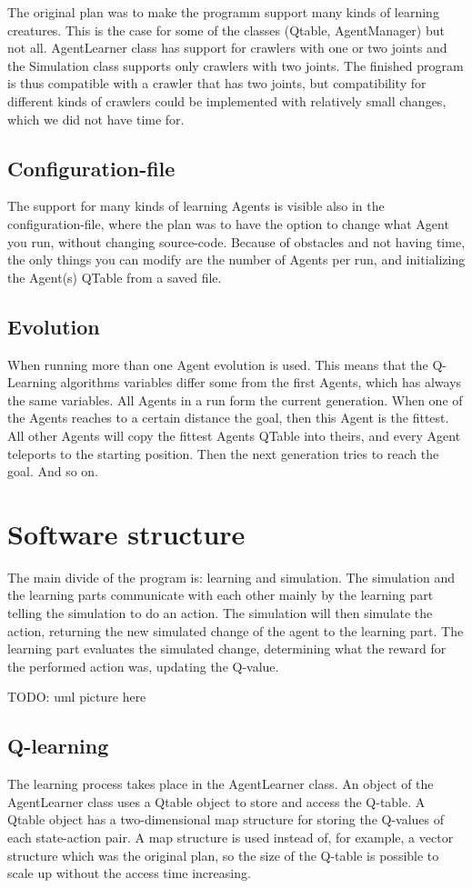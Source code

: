 \documentclass{article}
\begin{document}
The original plan was to make the programm support many kinds of learning
creatures. This is the case for some of the classes (Qtable, AgentManager)
but not all. AgentLearner class has support for crawlers with one or two joints
and the Simulation class supports only crawlers with two joints. The finished
program is thus compatible with a crawler that has two joints, but compatibility
for different kinds of crawlers could be implemented with relatively small
changes, which we did not have time for.

\subsection{Configuration-file}
The support for many kinds of learning Agents is visible also in the
configuration-file, where the plan was to have the option to change what
Agent you run, without changing source-code. Because of obstacles and
not having time, the only things you can modify are the number of Agents
per run, and initializing the Agent(s) QTable from a saved file.

\subsection{Evolution}
When running more than one Agent evolution is used. This means that the
Q-Learning algorithms variables differ some from the first Agents, which
has always the same variables.
All Agents in a run form the current generation. When one of the Agents
reaches to a certain distance the goal, then this Agent is the fittest. All
other Agents will copy the fittest Agents QTable into theirs, and every Agent
teleports to the starting position. Then the next generation tries to
reach the goal. And so on.


\section{Software structure}
The main divide of the program is: learning and simulation. The
simulation and the learning parts communicate with each other mainly by the
learning part telling the simulation to do an action. The simulation will then
simulate the action, returning the new simulated change of the agent to the
learning part. The learning part evaluates the simulated change, determining
what the reward for the performed action was, updating the Q-value.

TODO: uml picture here

\subsection{Q-learning}
The learning process takes place in the AgentLearner class.
An object of the AgentLearner
class uses a Qtable object to store and access the Q-table. A Qtable object
has a two-dimensional map structure for storing the Q-values of each
state-action pair. A map structure is used instead of, for example,
a vector structure which was the original plan, so the size of
the Q-table is possible to scale up without the access time increasing.
\end{document}
